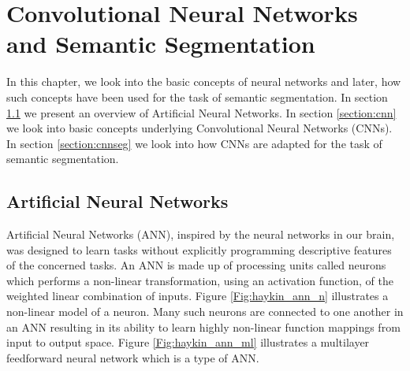 
\chapter{Convolutional Neural Networks and Semantic Segmentation}

	In this chapter, we look into the basic concepts of neural networks and later, how such concepts have been used for the task of semantic segmentation. In section \ref{section:ann} we present an overview of Artificial Neural Networks. In section \ref{section:cnn} we look into basic concepts underlying Convolutional Neural Networks (CNNs). In section \ref{section:cnnseg} we look into how CNNs are adapted for the task of semantic segmentation.

\section{Artificial Neural Networks}
\label{section:ann}

Artificial Neural Networks (ANN), inspired by the neural networks in our brain, was designed to learn tasks without explicitly programming descriptive features of the concerned tasks. An ANN is made up of processing units called neurons which performs a non-linear transformation, using an activation function, of the weighted linear combination of inputs. Figure \ref{Fig:haykin_ann_n} illustrates a non-linear model of a neuron. Many such neurons are connected to one another in an ANN resulting in its ability to learn highly non-linear function mappings from input to output space. Figure \ref{Fig:haykin_ann_ml} illustrates a multilayer feedforward neural network which is a type of ANN.

